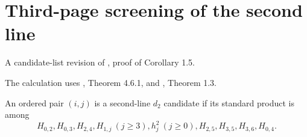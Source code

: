 \section{Third-page screening of the second line}
\begin{definition}
\label{sem:AdamsCalculations:two-line-d2-candidates}
A candidate-list revision of \cite{LWX126}, proof of Corollary 1.5.\par
The calculation uses \cite{Adams60}, Theorem 4.6.1, and \cite{LinExt4}, Theorem 1.3.

An ordered pair $(i,j)$ is a second-line $d_2$ candidate if its standard product is among
\[
 H_{0,2},H_{0,3},H_{2,4},H_{1,j}\ (j\geq3),h_j^2\ (j\geq0),
 H_{2,5},H_{3,5},H_{3,6},H_{0,4}.
\]
\end{definition}


